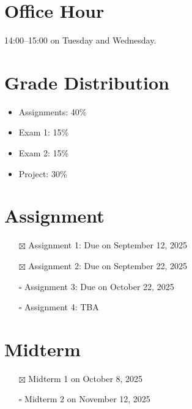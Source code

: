 \documentclass[
  letterpaper,
  DIV=11,
  numbers=noendperiod]{scrreprt}
\providecommand{\tightlist}{%
  \setlength{\itemsep}{0pt}\setlength{\parskip}{0pt}}
\begin{document}
\section*{Office Hour}\label{office-hour}


14:00--15:00 on Tuesday and Wednesday.

\section*{Grade Distribution}\label{grade-distribution}


\begin{itemize}
\tightlist
\item
  Assignments: 40\%
\item
  Exam 1: 15\%
\item
  Exam 2: 15\%
\item
  Project: 30\%
\end{itemize}

\section*{Assignment}\label{assignment}


\begin{itemize}
\tightlist
\item[$\boxtimes$]
  Assignment 1: Due on September 12, 2025
\item[$\boxtimes$]
  Assignment 2: Due on September 22, 2025
\item[$\square$]
  Assignment 3: Due on October 22, 2025
\item[$\square$]
  Assignment 4: TBA
\end{itemize}

\section*{Midterm}\label{midterm}


\begin{itemize}
\tightlist
\item[$\boxtimes$]
  Midterm 1 on October 8, 2025
\item[$\square$]
  Midterm 2 on November 12, 2025
\end{itemize}
\end{document}
